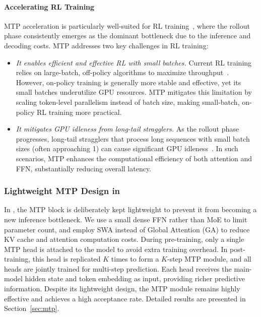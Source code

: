 \paragraph{Accelerating RL Training}
MTP acceleration is particularly well-suited for RL training~\citep{miles2025}, where the rollout phase consistently emerges as the dominant bottleneck due to the inference and decoding costs.
MTP addresses two key challenges in RL training:
\begin{itemize}
    \item 
    \textit{It enables efficient and effective RL with small batches.}
    Current RL training relies on large-batch, off-policy algorithms to maximize throughput~\citep{schulman2017proximal,zheng2025group,liu2025deepseek}.
    However, on-policy training is generally more stable and effective, yet its small batches underutilize GPU resources.
    MTP mitigates this limitation by scaling token-level parallelism instead of batch size, making small-batch, on-policy RL training more practical.
    \item 
    \textit{It mitigates GPU idleness from long-tail stragglers.} 
    As the rollout phase progresses, long-tail stragglers that process long sequences with small batch sizes (often approaching 1) can cause significant GPU idleness~\citep{zhong2025optimizing,gao2025rollpacker}. 
    In such scenarios, MTP enhances the computational efficiency of both attention and FFN, substantially reducing overall latency.
\end{itemize}

\subsubsection{Lightweight MTP Design in \mimoflash{}}
In \mimoflash{}, the MTP block is deliberately kept lightweight to prevent it from becoming a new inference bottleneck. We use a small dense FFN rather than MoE to limit parameter count, and employ SWA instead of Global Attention (GA) to reduce KV cache and attention computation costs.
During pre-training, only a single MTP head is attached to the model to avoid extra training overhead.
In post-training, this head is replicated $K$ times to form a $K$-step MTP module, and all heads are jointly trained for multi-step prediction.
Each head receives the main-model hidden state and token embedding as input, providing richer predictive information.
Despite its lightweight design, the MTP module remains highly effective and achieves a high acceptance rate.
Detailed results are presented in Section~\ref{sec:mtp}.